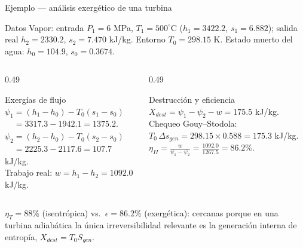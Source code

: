 \documentclass[aspectratio=169,10pt]{beamer}
\begin{document}
\begin{frame}{Ejemplo --- análisis exergético de una turbina}
\begin{cardgear}{Datos}{\faCalculator}
{\footnotesize
Vapor: entrada $P_1=6$ MPa, $T_1=500^\circ$C ($h_1=3422.2$, $s_1=6.882$); salida real $h_2=2330.2$, $s_2=7.470$ kJ/kg. Entorno $T_0=298.15$ K. Estado muerto del agua: $h_0=104.9$, $s_0=0.3674$.}
\end{cardgear}
\vspace{1.2mm}
\begin{columns}[T]
\begin{column}{0.49\textwidth}
\begin{cardidea}{Exergías de flujo}{\faSuperscript}
{\footnotesize
$\psi_1=(h_1-h_0)-T_0(s_1-s_0)$\\
$\phantom{\psi_1}=3317.3-1942.1=1375.2$.\\[0.6mm]
$\psi_2=(h_2-h_0)-T_0(s_2-s_0)$\\
$\phantom{\psi_2}=2225.3-2117.6=107.7$ kJ/kg.\\[0.6mm]
Trabajo real: $w=h_1-h_2=1092.0$ kJ/kg.}
\end{cardidea}
\end{column}
\begin{column}{0.49\textwidth}
\begin{cardidea}{Destrucción y eficiencia}{\faBalanceScale}
{\footnotesize
$X_{dest}=\psi_1-\psi_2-w=175.5$ kJ/kg.\\[0.6mm]
Chequeo Gouy--Stodola:\\
$T_0\,\Delta s_{gen}=298.15\times0.588=175.3$ kJ/kg.\;\checkmark\\[0.6mm]
$\displaystyle\eta_{II}=\frac{w}{\psi_1-\psi_2}=\frac{1092.0}{1267.5}=86.2\%$.}
\end{cardidea}
\end{column}
\end{columns}
\vspace{1.0mm}
\begin{cardnota}[\faInfoCircle]
$\eta_T=88\%$ (isentrópica) vs.\ $\epsilon=86.2\%$ (exergética): cercanas porque en una turbina adiabática la única irreversibilidad relevante es la generación interna de entropía, $X_{dest}=T_0S_{gen}$.
\end{cardnota}
\end{frame}
\end{document}
